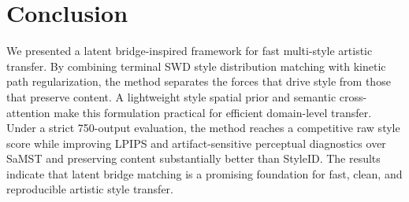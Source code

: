 \documentclass{article}
\begin{document}
\section{Conclusion}
We presented a latent bridge-inspired framework for fast multi-style artistic transfer. By combining terminal SWD style distribution matching with kinetic path regularization, the method separates the forces that drive style from those that preserve content. A lightweight style spatial prior and semantic cross-attention make this formulation practical for efficient domain-level transfer. Under a strict 750-output evaluation, the method reaches a competitive raw style score while improving LPIPS and artifact-sensitive perceptual diagnostics over SaMST and preserving content substantially better than StyleID. The results indicate that latent bridge matching is a promising foundation for fast, clean, and reproducible artistic style transfer.

\clearpage


\end{document}
